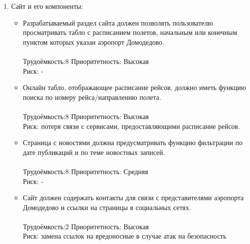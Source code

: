\begin{enumerate}
      \item Сайт и его компоненты:
      \begin{itemize}
            \item Разрабатываемый раздел сайта должен позволять
            пользователю просматривать табло с расписанием
            полетов, начальным или конечным пунктом которых
            указан аэропорт Домодедово.
            \\\\
            Трудоёмкость:8    Приоритетность: Высокая \\Риск: -
            \\
            \item Онлайн табло, отображающее расписание рейсов,
            должно иметь функцию поиска по номеру
            рейса/направлению полета.
            \\\\
            Трудоёмкость:8    Приоритетность: Высокая \\Риск: потеря связи с сервисами, предоставляющими расписание рейсов.
            \\
            \item Страница с новостями должна предусматривать
            функцию фильтрации по дате публикаций и по
            теме новостных записей.
            \\\\
            Трудоёмкость:8    Приоритетность: Средняя \\Риск: -
            \\
            \item Сайт должен содержать контакты для связи с
            представителями аэропорта Домодедово и ссылки
            на страницы в социальных сетях.
            \\\\
            Трудоёмкость:2    Приоритетность: Высокая \\Риск: замена ссылок на вредоносные в случае атак на безопасность
      \end{itemize}


\end{enumerate}

